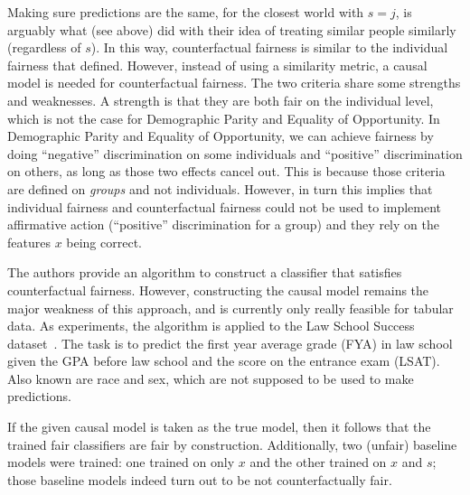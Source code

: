Making sure predictions are the same, for the closest world with \(s=j\), is arguably what
\citet{dwork2012fairness} (see above) did with their idea of treating similar people similarly
(regardless of \(s\)). In this way, counterfactual fairness is similar to the individual fairness
that \citet{dwork2012fairness} defined. However, instead of using a similarity metric, a causal
model is needed for counterfactual fairness. The two criteria share some strengths and weaknesses.
A strength is that they are both fair on the individual level, which is not the case for
Demographic Parity and Equality of Opportunity. In Demographic Parity and Equality of Opportunity,
we can achieve fairness by doing ``negative'' discrimination on some individuals and ``positive''
discrimination on others, as long as those two effects cancel out. This is because those criteria
are defined on \emph{groups} and not individuals. However, in turn this implies that individual
fairness and counterfactual fairness could not be used to implement affirmative action
(``positive'' discrimination for a group) and they rely on the features \(x\) being correct.

The authors provide an algorithm to construct a classifier that satisfies counterfactual fairness.
However, constructing the causal model remains the major weakness of this approach, and is
currently only really feasible for tabular data.
As experiments, the algorithm is applied to the Law School Success
dataset~\citep{wightman1998lsac}. The task is to predict the first year average grade (FYA) in law
school given the GPA before law school and the score on the entrance exam (LSAT). Also known are
race and sex, which are not supposed to be used to make predictions.

If the given causal model is taken as the true model, then it follows that the trained fair
classifiers are fair by construction.
Additionally, two (unfair) baseline models were trained: one trained on only \(x\) and the other
trained on \(x\) and \(s\); those baseline models indeed turn out to be not counterfactually fair.


